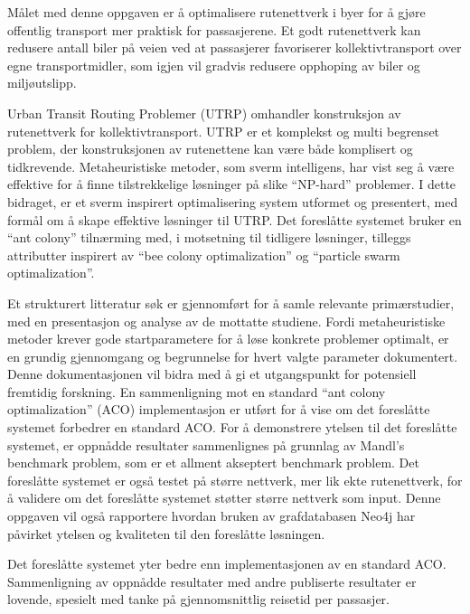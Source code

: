 Målet med denne oppgaven er å optimalisere rutenettverk i byer for å gjøre offentlig transport mer praktisk for passasjerene. Et godt rutenettverk kan redusere antall biler på veien ved at passasjerer favoriserer kollektivtransport over egne transportmidler, som igjen vil gradvis redusere opphoping av biler og miljøutslipp.

Urban Transit Routing Problemer (UTRP) omhandler konstruksjon av rutenettverk for kollektivtransport. UTRP er et komplekst og multi begrenset problem, der konstruksjonen av rutenettene kan være både komplisert og tidkrevende. Metaheuristiske metoder, som sverm intelligens, har vist seg å være effektive for å finne tilstrekkelige løsninger på slike ``NP-hard'' problemer. I dette bidraget, er et sverm inspirert optimalisering system utformet og presentert, med formål om å skape effektive løsninger til UTRP. Det foreslåtte systemet bruker en ``ant colony'' tilnærming med, i motsetning til tidligere løsninger, tilleggs attributter inspirert av ``bee colony optimalization'' og ``particle swarm optimalization''.

Et strukturert litteratur søk er gjennomført for å samle relevante primærstudier, med en presentasjon og analyse av de mottatte studiene. Fordi metaheuristiske metoder krever gode startparametere for å løse konkrete problemer optimalt, er en grundig gjennomgang og begrunnelse for hvert valgte parameter dokumentert. Denne dokumentasjonen vil bidra med å gi et utgangspunkt for potensiell fremtidig forskning. En sammenligning mot en standard ``ant colony optimalization'' (ACO) implementasjon er utført for å vise om det foreslåtte systemet forbedrer en standard ACO. For å demonstrere ytelsen til det foreslåtte systemet, er oppnådde resultater sammenlignes på grunnlag av Mandl’s benchmark problem, som er et allment akseptert benchmark problem. Det foreslåtte systemet er også testet på større nettverk, mer lik ekte rutenettverk, for å validere om det foreslåtte systemet støtter større nettverk som input. Denne oppgaven vil også rapportere hvordan bruken av grafdatabasen Neo4j har påvirket ytelsen og kvaliteten til den foreslåtte løsningen.

Det foreslåtte systemet yter bedre enn implementasjonen av en standard ACO. Sammenligning av oppnådde resultater med andre publiserte resultater er lovende, spesielt med tanke på gjennomsnittlig reisetid per passasjer.

